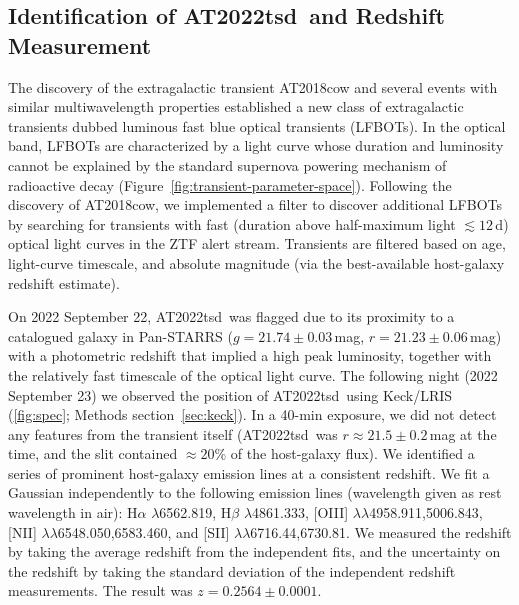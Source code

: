 \documentclass{nature_plusfigure}
\newcommand{\at}{AT2022tsd}
\begin{document}
\begin{methods}

\section{Identification of \at\ and Redshift Measurement}
\label{sec:discovery}

The discovery of the extragalactic transient AT2018cow\cite{Prentice2018} and several events with similar multiwavelength properties\cite{Coppejans2020,Ho2020_Koala,Yao2022,Perley2021} established a new class of extragalactic transients dubbed luminous fast blue optical transients (LFBOTs\cite{Metzger2022}).
In the optical band, LFBOTs are characterized by a light curve whose duration and luminosity cannot be explained by the standard supernova powering mechanism of radioactive decay (Figure~\ref{fig:transient-parameter-space}).
Following the discovery of AT2018cow, we implemented a filter to discover additional LFBOTs by searching for transients with fast (duration above half-maximum light $\lesssim12\,$d\cite{Drout2014}) optical light curves in the ZTF alert stream\cite{Ho2022_RET}.
Transients are filtered based on age, light-curve timescale, and absolute magnitude (via the best-available host-galaxy redshift estimate).

On 2022 September 22, \at\ was flagged due to its proximity to a catalogued galaxy in Pan-STARRS ($g=21.74\pm0.03$\,mag, $r=21.23\pm0.06$\,mag) with a photometric redshift that implied a high peak luminosity, together with the relatively fast timescale of the optical light curve.
The following night (2022 September 23) we observed the position of \at\ using Keck/LRIS (\ref{fig:spec}; Methods section~\ref{sec:keck}).
In a 40-min exposure, we did not detect any features from the transient itself (\at\ was $r\approx21.5\pm0.2$\,mag at the time, and the slit contained $\approx20\%$ of the host-galaxy flux). We identified a series of prominent host-galaxy emission lines at a consistent redshift. We fit a Gaussian independently to the following emission lines (wavelength given as rest wavelength in air): H$\alpha$ $\lambda$6562.819, H$\beta$ $\lambda$4861.333, 
 [OIII] $\lambda$$\lambda$4958.911,5006.843, 
  [NII] $\lambda$$\lambda$6548.050,6583.460, and [SII] $\lambda\lambda$6716.44,6730.81. 
We measured the redshift by taking the average redshift from the independent fits, and the uncertainty on the redshift by taking the standard deviation of the independent redshift measurements.
The result was $z=0.2564\pm0.0001$.


\end{methods}
\end{document}
